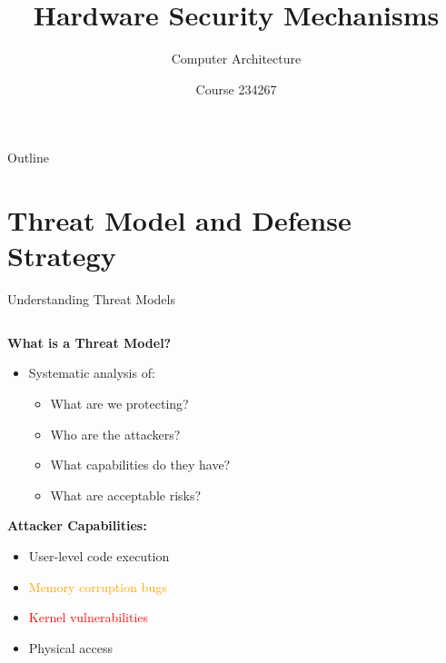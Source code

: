 \documentclass[aspectratio=169,12pt]{beamer}
\title{Hardware Security Mechanisms}
\subtitle{Computer Architecture}
\author{Course 234267}
\date{}
\begin{document}
\frame{\titlepage}

\begin{frame}{Outline}
    \tableofcontents
\end{frame}


\section{Threat Model and Defense Strategy}

\begin{frame}{Understanding Threat Models}
    \begin{columns}
        \begin{column}{0.5\textwidth}
            \textbf{What is a Threat Model?}
            \begin{itemize}
                \item Systematic analysis of:
                \begin{itemize}
                    \item What are we protecting?
                    \item Who are the attackers?
                    \item What capabilities do they have?
                    \item What are acceptable risks?
                \end{itemize}
            \end{itemize}
            
            \vspace{0.3cm}
            \textbf{Attacker Capabilities:}
            \begin{itemize}
                \item \textcolor{green!60!black}{User-level code execution}
                \item \textcolor{orange}{Memory corruption bugs}
                \item \textcolor{red}{Kernel vulnerabilities}
                \item \textcolor{red!80!black}{Physical access}
            \end{itemize}
        \end{column}
        \begin{column}{0.5\textwidth}
\end{column}
\end{columns}
\end{frame}
\end{document}
